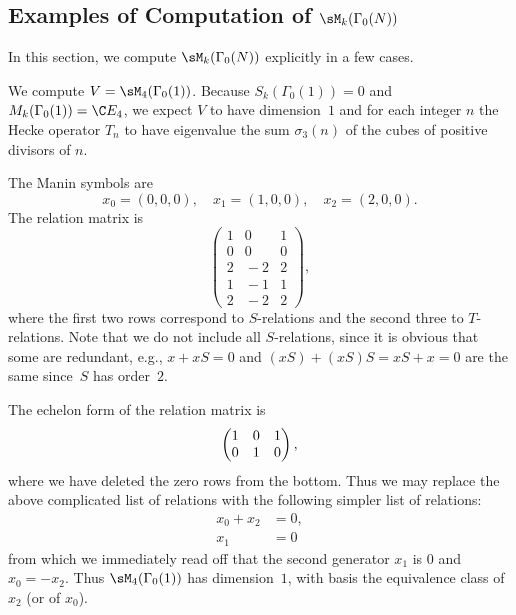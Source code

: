 \subsection{Examples of Computation of $\sM_k(\Gamma_0(N))$}
In this section, we compute $\sM_k(\Gamma_0(N))$ explicitly in a few cases.
\begin{example}\label{example:m4_1}
We compute $V=\sM_4(\Gamma_0(1))$.   Because $S_k(\Gamma_0(1))=0$
and $M_k(\Gamma_0(1))=\C E_4$, we expect $V$ to have dimension~$1$
and for each integer $n$ the Hecke operator $T_n$ to have eigenvalue the
sum $\sigma_3(n)$ of the cubes of positive divisors of $n$.

The Manin symbols are 
$$
  x_0 = (0, 0, 0), \quad x_1 = (1, 0, 0), \quad x_2 = (2, 0, 0).
$$
The relation matrix is
$$
\left(\begin{matrix}
{}1&{}0&{}1\\
{}0&{}0&{}0\\
\hline
{}2&{}-2&{}2\\
{}1&{}-1&{}1\\
{}2&{}-2&{}2
\end{matrix}\right),
$$
where the first two rows correspond to $S$-relations and the second
three to $T$-relations. 
Note that we do not include all $S$-relations, since it is obvious
that some are redundant, e.g., $x+xS=0$ and $(xS) + (xS)S=xS + x=0$
are the same since~$S$ has order~$2$.  

The echelon form of the relation matrix
is
$$
\left(\begin{matrix}
\hfill{}1&\hfill{}0&\hfill{}1\\
\hfill{}0&\hfill{}1&\hfill{}0\\
\end{matrix}\right),
$$
where we have deleted the zero rows from the bottom.
Thus we may replace the above complicated list
of relations with the following simpler list of relations:
\begin{align*}
   x_0 + x_2  &= 0,\\
    x_1 &= 0
\end{align*}
from which we immediately read off that the second generator $x_1$ is
$0$ and $x_0=-x_2$.  Thus $\sM_4(\Gamma_0(1))$ has dimension~$1$, with
basis the equivalence class of $x_2$ (or of $x_0$).


\end{example}
